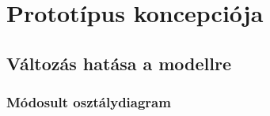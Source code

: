 %

\chapter{Prototípus koncepciója}

\thispagestyle{fancy}

\setcounter{section}{-1}

\section{Változás hatása a modellre}

\subsection{Módosult osztálydiagram}

